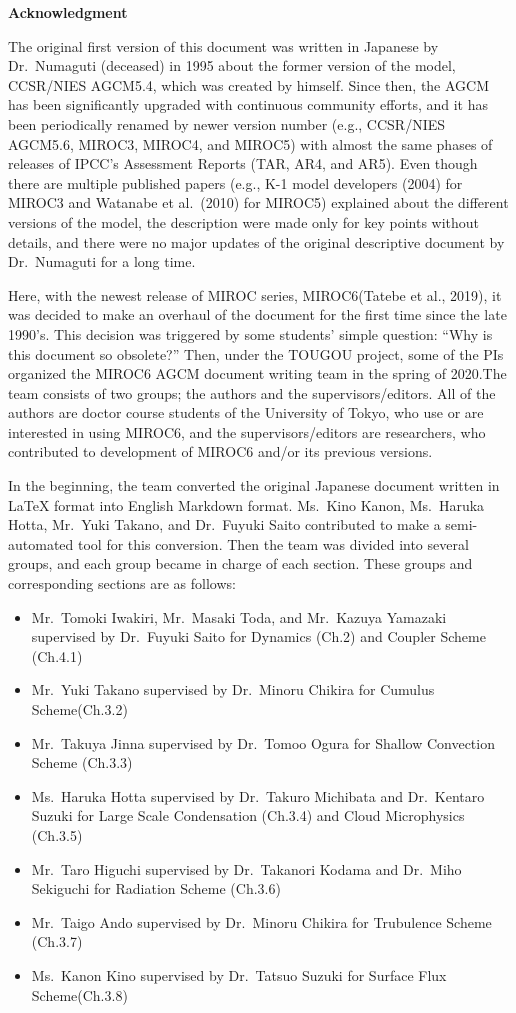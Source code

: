 \textbf{Acknowledgment}

The original first version of this document was written in Japanese by
Dr.~Numaguti (deceased) in 1995 about the former version of the model,
CCSR/NIES AGCM5.4, which was created by himself. Since then, the AGCM
has been significantly upgraded with continuous community efforts, and
it has been periodically renamed by newer version number (e.g.,
CCSR/NIES AGCM5.6, MIROC3, MIROC4, and MIROC5) with almost the same
phases of releases of IPCC's Assessment Reports (TAR, AR4, and AR5).
Even though there are multiple published papers (e.g., K-1 model
developers (2004) for MIROC3 and Watanabe et al.~(2010) for MIROC5)
explained about the different versions of the model, the description
were made only for key points without details, and there were no major
updates of the original descriptive document by Dr.~Numaguti for a long
time.

Here, with the newest release of MIROC series, MIROC6(Tatebe et al.,
2019), it was decided to make an overhaul of the document for the first
time since the late 1990's. This decision was triggered by some
students' simple question: ``Why is this document so obsolete?'' Then,
under the TOUGOU project, some of the PIs organized the MIROC6 AGCM
document writing team in the spring of 2020.The team consists of two
groups; the authors and the supervisors/editors. All of the authors are
doctor course students of the University of Tokyo, who use or are
interested in using MIROC6, and the supervisors/editors are researchers,
who contributed to development of MIROC6 and/or its previous versions.

In the beginning, the team converted the original Japanese document
written in LaTeX format into English Markdown format. Ms.~Kino Kanon,
Ms.~Haruka Hotta, Mr.~Yuki Takano, and Dr.~Fuyuki Saito contributed to
make a semi-automated tool for this conversion. Then the team was
divided into several groups, and each group became in charge of each
section. These groups and corresponding sections are as follows:

\begin{itemize}
\item
  Mr.~Tomoki Iwakiri, Mr.~Masaki Toda, and Mr.~Kazuya Yamazaki
  supervised by Dr.~Fuyuki Saito for Dynamics (Ch.2) and Coupler Scheme
  (Ch.4.1)
\item
  Mr.~Yuki Takano supervised by Dr.~Minoru Chikira for Cumulus
  Scheme(Ch.3.2)
\item
  Mr.~Takuya Jinna supervised by Dr.~Tomoo Ogura for Shallow Convection
  Scheme (Ch.3.3)
\item
  Ms.~Haruka Hotta supervised by Dr.~Takuro Michibata and Dr.~Kentaro
  Suzuki for Large Scale Condensation (Ch.3.4) and Cloud Microphysics
  (Ch.3.5)
\item
  Mr.~Taro Higuchi supervised by Dr.~Takanori Kodama and Dr.~Miho
  Sekiguchi for Radiation Scheme (Ch.3.6)
\item
  Mr.~Taigo Ando supervised by Dr.~Minoru Chikira for Trubulence Scheme
  (Ch.3.7)
\item
  Ms.~Kanon Kino supervised by Dr.~Tatsuo Suzuki for Surface Flux
  Scheme(Ch.3.8)
\end{itemize}

